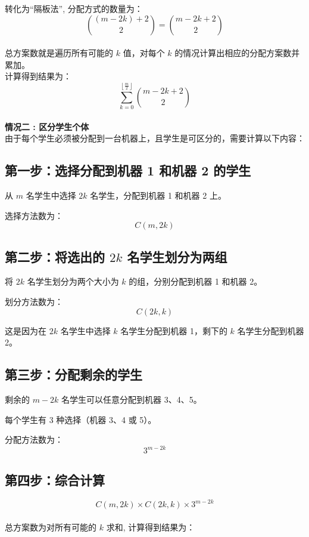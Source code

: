 \documentclass{article}
\begin{document}
转化为“隔板法”, 分配方式的数量为：
\[
\binom{(m - 2k) + 2}{2} = \binom{m - 2k + 2}{2}
\]\\

总方案数就是遍历所有可能的 \( k \) 值，对每个 \( k \) 的情况计算出相应的分配方案数并累加。  \\

计算得到结果为：
\[
\boxed{\sum_{k=0}^{\left\lfloor \frac{m}{2} \right\rfloor} \binom{m - 2k + 2}{2}}
\]
\\
\textbf{情况二 : 区分学生个体}\\

由于每个学生必须被分配到一台机器上，且学生是可区分的，需要计算以下内容：

\subsection*{第一步：选择分配到机器 1 和机器 2 的学生}

从 $m$ 名学生中选择 $2k$ 名学生，分配到机器 1 和机器 2 上。

选择方法数为：
\[
C(m, 2k)
\]

\subsection*{第二步：将选出的 $2k$ 名学生划分为两组}

将 $2k$ 名学生划分为两个大小为 $k$ 的组，分别分配到机器 1 和机器 2。

划分方法数为：
\[
C(2k, k)
\]

这是因为在 $2k$ 名学生中选择 $k$ 名学生分配到机器 1，剩下的 $k$ 名学生分配到机器 2。

\subsection*{第三步：分配剩余的学生}

剩余的 $m - 2k$ 名学生可以任意分配到机器 3、4、5。

每个学生有 3 种选择（机器 3、4 或 5）。

分配方法数为：
\[
3^{m - 2k}
\]

\subsection*{第四步：综合计算}

\[
C(m, 2k) \times C(2k, k) \times 3^{m - 2k}
\]\\

总方案数为对所有可能的 $k$ 求和, 计算得到结果为：
\end{document}
